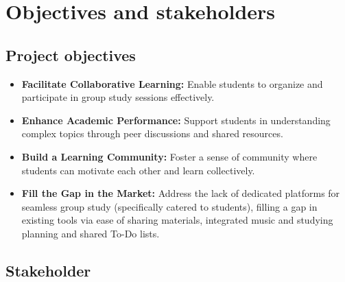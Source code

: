 \chapter{Objectives and stakeholders}

\section{Project objectives}
\label{sect:objectives}

\begin{itemize}
    \item \textbf{Facilitate Collaborative Learning:} Enable students to organize and participate in group study sessions effectively.
    \item \textbf{Enhance Academic Performance:} Support students in understanding complex topics through peer discussions and shared resources.
    \item \textbf{Build a Learning Community:} Foster a sense of community where students can motivate each other and learn collectively.
    \item \textbf{Fill the Gap in the Market:} Address the lack of dedicated platforms for seamless group study (specifically catered to students), filling a gap in existing tools via ease of sharing materials, integrated music and studying planning and shared To-Do lists.
\end{itemize}

\section{Stakeholder}
\label{sect:stakeholder}

